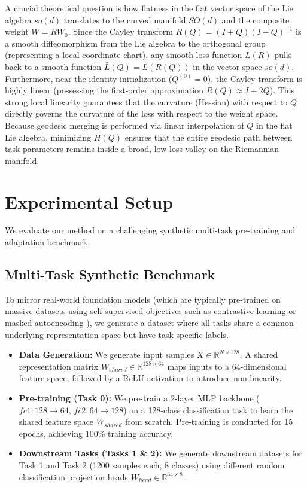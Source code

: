\documentclass{article}
\theoremstyle{plain}
\theoremstyle{definition}
\theoremstyle{remark}
\begin{document}
A crucial theoretical question is how flatness in the flat vector space of the Lie algebra $so(d)$ translates to the curved manifold $SO(d)$ and the composite weight $W = R W_0$. Since the Cayley transform $R(Q) = (I+Q)(I-Q)^{-1}$ is a smooth diffeomorphism from the Lie algebra to the orthogonal group (representing a local coordinate chart), any smooth loss function $L(R)$ pulls back to a smooth function $\bar{L}(Q) = L(R(Q))$ in the vector space $so(d)$. Furthermore, near the identity initialization ($Q^{(0)} = 0$), the Cayley transform is highly linear (possessing the first-order approximation $R(Q) \approx I + 2Q$). This strong local linearity guarantees that the curvature (Hessian) with respect to $Q$ directly governs the curvature of the loss with respect to the weight space. Because geodesic merging is performed via linear interpolation of $Q$ in the flat Lie algebra, minimizing $H(Q)$ ensures that the entire geodesic path between task parameters remains inside a broad, low-loss valley on the Riemannian manifold.

\section{Experimental Setup}
\label{submission-experiments}

We evaluate our method on a challenging synthetic multi-task pre-training and adaptation benchmark.

\subsection{Multi-Task Synthetic Benchmark}
To mirror real-world foundation models (which are typically pre-trained on massive datasets using self-supervised objectives such as contrastive learning \cite{caron2021emerging} or masked autoencoding \cite{he2022masked}), we generate a dataset where all tasks share a common underlying representation space but have task-specific labels. 
\begin{itemize}
  \item \textbf{Data Generation:} We generate input samples $X \in \mathbb{R}^{N \times 128}$. A shared representation matrix $W_{shared} \in \mathbb{R}^{128 \times 64}$ maps inputs to a 64-dimensional feature space, followed by a ReLU activation to introduce non-linearity. 
  \item \textbf{Pre-training (Task 0):} We pre-train a 2-layer MLP backbone ($fc1: 128 \rightarrow 64$, $fc2: 64 \rightarrow 128$) on a 128-class classification task to learn the shared feature space $W_{shared}$ from scratch. Pre-training is conducted for 15 epochs, achieving $100\%$ training accuracy.
  \item \textbf{Downstream Tasks (Tasks 1 \& 2):} We generate downstream datasets for Task 1 and Task 2 (1200 samples each, 8 classes) using different random classification projection heads $W_{head} \in \mathbb{R}^{64 \times 8}$. 
\end{itemize}
\end{document}
